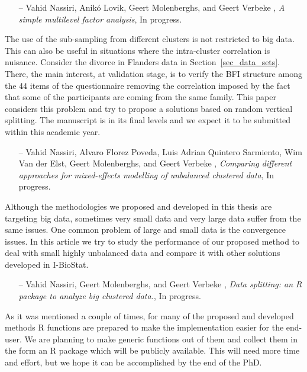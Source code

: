 \documentclass[14pt]{article}
\begin{document}
\begin{itemize}
\item[--]{\textsf{Vahid Nassiri, Anik\'{o} Lovik, Geert Molenberghs, and Geert Verbeke}} , {\it A simple multilevel factor analysis}, In progress.
\end{itemize}
The use of the sub-sampling from different clusters is not restricted to big data. This can also be useful in situations where the intra-cluster correlation is nuisance. Consider the divorce in Flanders data in Section~\ref{sec_data_sets}. There, the main interest, at validation stage, is to verify the BFI structure among the 44 items of the questionnaire removing the correlation imposed by the fact that some of the participants are coming from the same family. This paper considers this problem and try to propose a solutions based on random vertical splitting. The manuscript is in its final levels and we expect it to be submitted within this academic year.


\begin{itemize}
\item[--]{\textsf{Vahid Nassiri, Alvaro Florez Poveda, Luis Adrian Quintero Sarmiento, Wim Van der Elst, Geert Molenberghs, and Geert Verbeke}} , {\it Comparing different approaches for mixed-effects modelling of unbalanced clustered data}, In progress.
\end{itemize}
Although the methodologies we proposed and developed in this thesis are targeting big data, sometimes very small data and very large data suffer from the same issues. One common problem of large and small data is the convergence issues. In this article we try to study the performance of our proposed method to deal with small highly unbalanced data and compare it with other solutions developed in I-BioStat.


\begin{itemize}
\item[--]{\textsf{Vahid Nassiri, Geert Molenberghs, and Geert Verbeke}} , {\it Data splitting: an \textsf{R} package to analyze big clustered data.}, In progress.
\end{itemize}
As it was mentioned a couple of times, for many of the proposed and developed methods \textsf{R} functions are prepared to make the implementation easier for the end-user. We are planning to make generic functions out of them and collect them in the form an \textsf{R} package which will be publicly available. This will need more time and effort, but we hope it can be accomplished by the end of the PhD.
\end{document}

